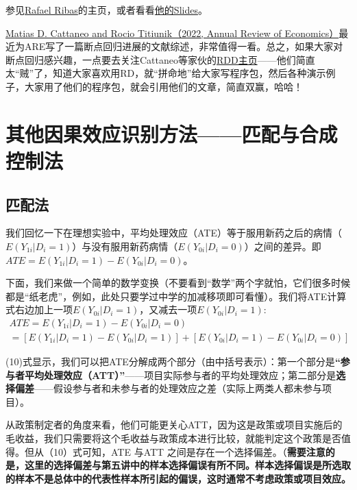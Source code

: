 \documentclass[cn,12pt,math=newtx,citestyle=gb7714-2015,bibstyle=gb7714-2015]{elegantbook}
\begin{document}
	参见\href{https://sites.google.com/site/r4ribas/codes}{Rafael Ribas}的主页，或者看看\href{https://www.stata.com/meeting/chicago16/slides/chicago16_ribas.pdf}{他的Slides}。
	
	\href{https://rdpackages.github.io/references/Cattaneo-Titiunik_2021_ARE.pdf}{Matias D. Cattaneo and Rocio Titiunik（2022, Annual Review of Economics）}最近为ARE写了一篇断点回归进展的文献综述，非常值得一看。总之，如果大家对断点回归感兴趣，一点要去关注Cattaneo等家伙的\href{https://rdpackages.github.io/}{RDD主页}——他们简直太“贼”了，知道大家喜欢用RD，就“拼命地”给大家写程序包，然后各种演示例子，大家用了他们的程序包，就会引用他们的文章，简直双赢，哈哈！
	
	
	
	
	\chapter{其他因果效应识别方法——匹配与合成控制法}
	
	\section{匹配法}
	
	我们回忆一下在理想实验中，平均处理效应（ATE）等于服用新药之后的病情（$E(Y_{1i}\big|D_i=1)$）与没有服用新药病情（$E(Y_{0i}\big|D_i=0)$）之间的差异。即
	$ATE=E(Y_{1i}\big|D_i=1)-E(Y_{0i}\big|D_i=0)$。
	
	下面，我们来做一个简单的数学变换（不要看到“数学”两个字就怕，它们很多时候都是“纸老虎”，例如，此处只要学过中学的加减移项即可看懂）。我们将ATE计算式右边加上一项$E(Y_{0i}\big|D_i=1)$，又减去一项$E(Y_{0i}\big|D_i=1)$:
	\begin{gather}
		ATE=E(Y_{1i}\big|D_i=1)-E(Y_{0i}\big|D_i=0)\nonumber\\
		=[E(Y_{1i}\big|D_i=1)-E(Y_{0i}\big|D_i=1)]+[E(Y_{0i}\big|D_i=1)-E(Y_{0i}\big|D_i=0)]
	\end{gather}
	
	(10)式显示，我们可以把ATE分解成两个部分（由中括号表示）：第一个部分是\textbf{“参与者平均处理效应（ATT）”}——项目实际参与者的平均处理效应；第二部分是\textbf{选择偏差}——假设参与者和未参与者的处理效应之差（实际上两类人都未参与项目）。
	
	从政策制定者的角度来看，他们可能更关心ATT，因为这是政策或项目实施后的毛收益，我们只需要将这个毛收益与政策成本进行比较，就能判定这个政策是否值得。但从（10）式可知，ATE 与ATT 之间是存在一个选择偏差。（\textbf{需要注意的是，这里的选择偏差与第五讲中的样本选择偏误有所不同。样本选择偏误是所选取的样本不是总体中的代表性样本所引起的偏误，这时通常不考虑政策或项目效应。}
	
\end{document}
